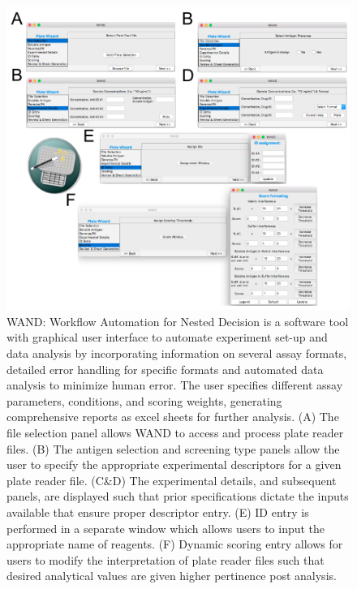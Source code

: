 \begin{figure}[ht]
 \centering
 \includegraphics{graphics/ch3/Figure_S1.pdf}
 \caption{WAND: Workflow Automation for Nested Decision is a software tool with graphical user interface to automate experiment set-up and data analysis by incorporating information on several assay formats, detailed error handling for specific formats and automated data analysis to minimize human error. The user specifies different assay parameters, conditions, and scoring weights, generating comprehensive reports as excel sheets for further analysis. (A) The file selection panel allows WAND to access and process plate reader files. (B) The antigen selection and screening type panels allow the user to specify the appropriate experimental descriptors for a given plate reader file.  (C&D) The experimental details, and subsequent panels, are displayed such that prior specifications dictate the inputs available that ensure proper descriptor entry.  (E) ID entry is performed in a separate window which allows users to input the appropriate name of reagents.  (F) Dynamic scoring entry allows for users to modify the interpretation of plate reader files such that desired analytical values are given higher pertinence post analysis.}
 \end{figure}
 
